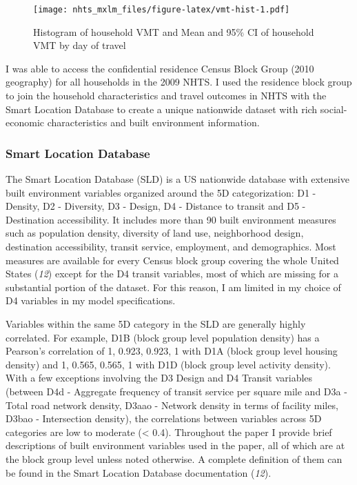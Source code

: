 \documentclass[numbered]{trbunofficial}
\begin{document}
\begin{figure}
\centering
\texttt{[image: nhts\_mxlm\_files/figure-latex/vmt-hist-1.pdf]}
\caption{\label{fig:vmt-hist}Histogram of household VMT and Mean and 95\% CI of household VMT by day of travel}
\end{figure}

I was able to access the confidential residence Census Block Group (2010 geography) for all households in the 2009 NHTS. I used the residence block group to join the household characteristics and travel outcomes in NHTS with the Smart Location Database to create a unique nationwide dataset with rich social-economic characteristics and built environment information.

\hypertarget{smart-location-database}{%
\subsubsection{Smart Location Database}\label{smart-location-database}}

The Smart Location Database (SLD) is a US nationwide database with extensive built environment variables organized around the 5D categorization: D1 - Density, D2 - Diversity, D3 - Design, D4 - Distance to transit and D5 - Destination accessibility. It includes more than 90 built environment measures such as population density, diversity of land use, neighborhood design, destination accessibility, transit service, employment, and demographics. Most measures are available for every Census block group covering the whole United States (\emph{12}) except for the D4 transit variables, most of which are missing for a substantial portion of the dataset. For this reason, I am limited in my choice of D4 variables in my model specifications.

Variables within the same 5D category in the SLD are generally highly correlated. For example, D1B (block group level population density) has a Pearson's correlation of 1, 0.923, 0.923, 1 with D1A (block group level housing density) and 1, 0.565, 0.565, 1 with D1D (block group level activity density). With a few exceptions involving the D3 Design and D4 Transit variables (between D4d - Aggregate frequency of transit service per square mile and D3a - Total road network density, D3aao - Network density in terms of facility miles, D3bao - Intersection density), the correlations between variables across 5D categories are low to moderate (\textless{} 0.4). Throughout the paper I provide brief descriptions of built environment variables used in the paper, all of which are at the block group level unless noted otherwise. A complete definition of them can be found in the Smart Location Database documentation (\emph{12}).
\end{document}

